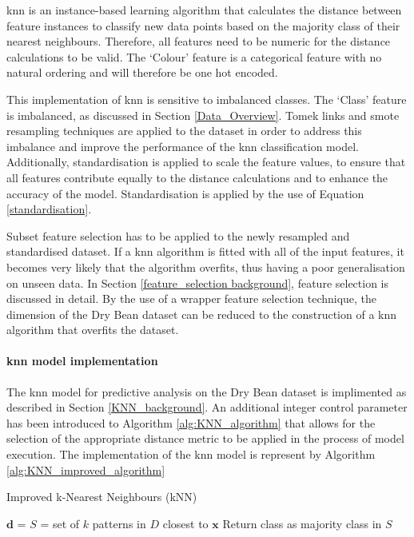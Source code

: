 \documentclass[10pt, conference]{IEEEtran}
\begin{document}
\acrshort{knn} is an instance-based learning algorithm that calculates the distance between feature
instances to classify new data points based on the majority class of their nearest neighbours. Therefore, all features need
to be numeric for the distance calculations to be valid. The `Colour' feature is a categorical feature with no
natural ordering and will therefore be one hot encoded.

This implementation of \acrshort{knn} is sensitive to imbalanced classes. The `Class' feature is imbalanced, as
discussed in Section \ref{Data_Overview}. Tomek links and \acrshort{smote} resampling techniques are applied to the
dataset in order to address this imbalance and improve the performance of the \acrshort{knn} classification model.
Additionally, standardisation is applied to scale the feature values, to ensure that all features contribute
equally to the distance calculations and to enhance the accuracy of the model. Standardisation is applied
by the use of Equation \eqref{standardisation}.

Subset feature selection has to be applied to the newly resampled and standardised dataset. If a \acrshort{knn} algorithm
is fitted with all of the input features, it becomes very likely that the algorithm overfits, thus having a poor
generalisation on unseen data. In Section \ref{feature_selection background}, feature selection is discussed in detail.
By the use of a wrapper feature selection technique, the dimension of the Dry Bean dataset can be reduced to the
construction of a \acrshort{knn} algorithm that overfits the dataset.

\paragraph{\acrshort{knn} model implementation}

The \acrshort{knn} model for predictive analysis on the Dry Bean dataset is implimented as described
in Section \ref{KNN_background}. An additional integer control parameter has been introduced to
Algorithm \ref{alg:KNN_algorithm} that allows for the selection of the appropriate distance metric
to be applied in the process of model execution. The implementation of the \acrshort{knn} model is represent
by Algorithm \ref{alg:KNN_improved_algorithm}
\begin{algorithm}
    \caption{Improved k-Nearest Neighbours (kNN)}
    \label{alg:KNN_improved_algorithm}
    \begin{algorithmic}[1]
                \State $\boldsymbol{\textbf{d}}$ = 
            \EndFor
            \State {}
            \State $S$ = set of $k$ patterns in $D$ closest to $\boldsymbol{\textbf{x}}$
            \State Return class as majority class in $S$
        \EndFunction
    \end{algorithmic}
\end{algorithm}
\end{document}
